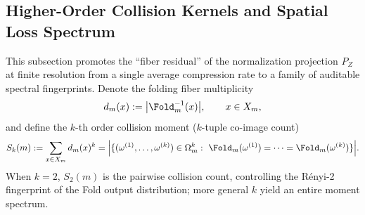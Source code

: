 \subsection{Higher-Order Collision Kernels and Spatial Loss Spectrum}\label{subsec:pom-higher-collision-spectrum}
This subsection promotes the ``fiber residual'' of the normalization projection $P_Z$ at finite resolution from a single average compression rate to a family of auditable spectral fingerprints. Denote the folding fiber multiplicity
$$
d_m(x):=\bigl|\Fold_m^{-1}(x)\bigr|,\qquad x\in X_m,
$$
and define the $k$-th order collision moment ($k$-tuple co-image count)
$$
S_k(m):=\sum_{x\in X_m} d_m(x)^k
=\Bigl|\{(\omega^{(1)},\dots,\omega^{(k)})\in\Omega_m^k:\ \Fold_m(\omega^{(1)})=\cdots=\Fold_m(\omega^{(k)})\}\Bigr|.
$$
When $k=2$, $S_2(m)$ is the pairwise collision count, controlling the R\'enyi-2 fingerprint of the Fold output distribution; more general $k$ yield an entire moment spectrum.

